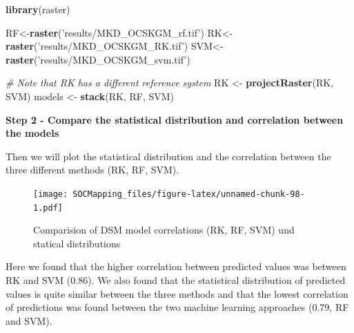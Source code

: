 \documentclass[10pt,b5paper,]{book}
\newenvironment{Shaded}{\begin{snugshade}}{\end{snugshade}}
\newcommand{\CommentTok}[1]{\textcolor[rgb]{0.56,0.35,0.01}{\textit{#1}}}
\newcommand{\DataTypeTok}[1]{\textcolor[rgb]{0.13,0.29,0.53}{#1}}
\newcommand{\KeywordTok}[1]{\textcolor[rgb]{0.13,0.29,0.53}{\textbf{#1}}}
\newcommand{\NormalTok}[1]{#1}
\newcommand{\OtherTok}[1]{\textcolor[rgb]{0.56,0.35,0.01}{#1}}
\newcommand{\StringTok}[1]{\textcolor[rgb]{0.31,0.60,0.02}{#1}}
\theoremstyle{definition}
\theoremstyle{definition}
\theoremstyle{definition}
\theoremstyle{remark}
\begin{document}
\begin{Shaded}
\begin{Highlighting}[]
\KeywordTok{library}\NormalTok{(raster)}

\NormalTok{RF<-}\KeywordTok{raster}\NormalTok{(}\StringTok{'results/MKD_OCSKGM_rf.tif'}\NormalTok{)}
\NormalTok{RK<-}\KeywordTok{raster}\NormalTok{(}\StringTok{'results/MKD_OCSKGM_RK.tif'}\NormalTok{)}
\NormalTok{SVM<-}\KeywordTok{raster}\NormalTok{(}\StringTok{'results/MKD_OCSKGM_svm.tif'}\NormalTok{)}

\CommentTok{# Note that RK has a different reference system }
\NormalTok{RK <-}\StringTok{ }\KeywordTok{projectRaster}\NormalTok{(RK, SVM)}
\NormalTok{models <-}\StringTok{ }\KeywordTok{stack}\NormalTok{(RK, RF, SVM)}
\end{Highlighting}
\end{Shaded}

\textbf{Step 2 - Compare the statistical distribution and correlation
between the models}

Then we will plot the statistical distribution and the correlation
between the three different methods (RK, RF, SVM).

\begin{Shaded}
\end{Shaded}

\begin{figure}
\centering
\texttt{[image: SOCMapping\_files/figure-latex/unnamed-chunk-98-1.pdf]}
\caption{\label{fig:unnamed-chunk-98}Comparision of DSM model correlations
(RK, RF, SVM) und statical distributions}
\end{figure}

Here we found that the higher correlation between predicted values was
between RK and SVM (0.86). We also found that the statistical
distribution of predicted values is quite similar between the three
methods and that the lowest correlation of predictions was found between
the two machine learning approaches (0.79, RF and SVM).
\end{document}

